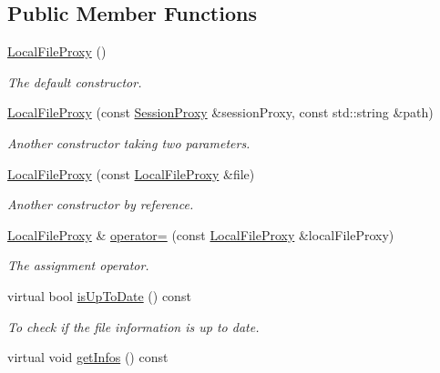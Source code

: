 \subsection*{Public Member Functions}
\begin{DoxyCompactItemize}
\item 
\hypertarget{classLocalFileProxy_abf0605af90046f4f1212b5cc3416f627}{
\hyperlink{classLocalFileProxy_abf0605af90046f4f1212b5cc3416f627}{LocalFileProxy} ()}
\label{classLocalFileProxy_abf0605af90046f4f1212b5cc3416f627}

\begin{DoxyCompactList}\small\item\em The default constructor. \item\end{DoxyCompactList}\item 
\hyperlink{classLocalFileProxy_ac6ce5c9939256eccb0371aa45417e5eb}{LocalFileProxy} (const \hyperlink{classSessionProxy}{SessionProxy} \&sessionProxy, const std::string \&path)
\begin{DoxyCompactList}\small\item\em Another constructor taking two parameters. \item\end{DoxyCompactList}\item 
\hyperlink{classLocalFileProxy_aa15ee30b8332e8eb45c66f092e89d5e1}{LocalFileProxy} (const \hyperlink{classLocalFileProxy}{LocalFileProxy} \&file)
\begin{DoxyCompactList}\small\item\em Another constructor by reference. \item\end{DoxyCompactList}\item 
\hyperlink{classLocalFileProxy}{LocalFileProxy} \& \hyperlink{classLocalFileProxy_a450a9bb2548efc8dab572f76ba14e43f}{operator=} (const \hyperlink{classLocalFileProxy}{LocalFileProxy} \&localFileProxy)
\begin{DoxyCompactList}\small\item\em The assignment operator. \item\end{DoxyCompactList}\item 
virtual bool \hyperlink{classLocalFileProxy_a9ed33dbb31ca97cb34785cebfeaf5631}{isUpToDate} () const 
\begin{DoxyCompactList}\small\item\em To check if the file information is up to date. \item\end{DoxyCompactList}\item 
\hypertarget{classLocalFileProxy_a34f8ca7057c2b12fe96befff14bca26e}{
virtual void \hyperlink{classLocalFileProxy_a34f8ca7057c2b12fe96befff14bca26e}{getInfos} () const }
\label{classLocalFileProxy_a34f8ca7057c2b12fe96befff14bca26e}


\end{DoxyCompactItemize}
